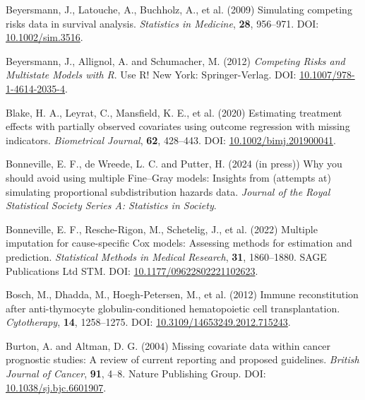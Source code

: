 \documentclass[
  letterpaper,
  DIV=11,
  numbers=noendperiod]{scrreprt}
\newlength{\cslhangindent}
\newlength{\cslentryspacingunit} %
\newenvironment{CSLReferences}[2] %
 {%
  \setlength{\parindent}{0pt}
  \ifodd #1
  \let\oldpar\par
  \def\par{\hangindent=\cslhangindent\oldpar}
  \fi
  \setlength{\parskip}{#2\cslentryspacingunit}
 }%
 {}
\begin{document}
\begin{CSLReferences}{1}{0}
\leavevmode{}%
Beyersmann, J., Latouche, A., Buchholz, A., et al. (2009) Simulating
competing risks data in survival analysis. \emph{Statistics in
Medicine}, \textbf{28}, 956--971. DOI:
\href{https://doi.org/10.1002/sim.3516}{10.1002/sim.3516}.

\leavevmode{}%
Beyersmann, J., Allignol, A. and Schumacher, M. (2012) \emph{Competing
{Risks} and {Multistate Models} with {R}}. Use {R}! New York:
Springer-Verlag. DOI:
\href{https://doi.org/10.1007/978-1-4614-2035-4}{10.1007/978-1-4614-2035-4}.

\leavevmode{}%
Blake, H. A., Leyrat, C., Mansfield, K. E., et al. (2020) Estimating
treatment effects with partially observed covariates using outcome
regression with missing indicators. \emph{Biometrical Journal},
\textbf{62}, 428--443. DOI:
\href{https://doi.org/10.1002/bimj.201900041}{10.1002/bimj.201900041}.

\leavevmode{}%
Bonneville, E. F., de Wreede, L. C. and Putter, H. (2024 (in press)) Why
you should avoid using multiple {Fine}--{Gray} models: Insights from
(attempts at) simulating proportional subdistribution hazards data.
\emph{Journal of the Royal Statistical Society Series A: Statistics in
Society}.

\leavevmode{}%
Bonneville, E. F., Resche-Rigon, M., Schetelig, J., et al. (2022)
Multiple imputation for cause-specific {Cox} models: {Assessing} methods
for estimation and prediction. \emph{Statistical Methods in Medical
Research}, \textbf{31}, 1860--1880. SAGE Publications Ltd STM. DOI:
\href{https://doi.org/10.1177/09622802221102623}{10.1177/09622802221102623}.

\leavevmode{}%
Bosch, M., Dhadda, M., Hoegh-Petersen, M., et al. (2012) Immune
reconstitution after anti-thymocyte globulin-conditioned hematopoietic
cell transplantation. \emph{Cytotherapy}, \textbf{14}, 1258--1275. DOI:
\href{https://doi.org/10.3109/14653249.2012.715243}{10.3109/14653249.2012.715243}.

\leavevmode{}%
Burton, A. and Altman, D. G. (2004) Missing covariate data within cancer
prognostic studies: A review of current reporting and proposed
guidelines. \emph{British Journal of Cancer}, \textbf{91}, 4--8. Nature
Publishing Group. DOI:
\href{https://doi.org/10.1038/sj.bjc.6601907}{10.1038/sj.bjc.6601907}.


\end{CSLReferences}
\end{document}
